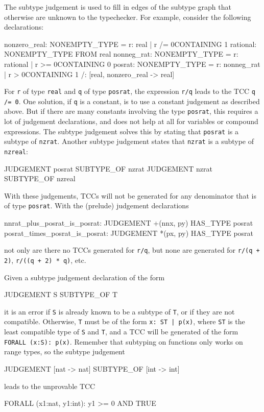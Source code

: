 The subtype judgement is used to fill in edges of the subtype graph that
otherwise are unknown to the typechecker.  For example, consider the
following declarations:
\begin{pvsex}
  nonzero_real: NONEMPTY_TYPE = \setb{}r: real | r /= 0\sete CONTAINING 1
  rational: NONEMPTY_TYPE FROM real
  nonneg_rat: NONEMPTY_TYPE = \setb{}r: rational | r >= 0\sete CONTAINING 0
  posrat: NONEMPTY_TYPE = \setb{}r: nonneg_rat | r > 0\sete  CONTAINING 1
  /: [real, nonzero_real -> real]
\end{pvsex}
For \texttt{r} of type \texttt{real} and \texttt{q} of type
\texttt{posrat}, the expression \texttt{r/q} leads to the TCC \texttt{q
/= 0}.  One solution, if \texttt{q} is a constant, is to use a constant
judgement as described above.  But if there are many constants involving
the type \texttt{posrat}, this requires a lot of judgement declarations,
and does not help at all for variables or compound expressions.  The
subtype judgement solves this by stating that \texttt{posrat} is a subtype
of \texttt{nzrat}.  Another subtype judgement states that \texttt{nzrat}
is a subtype of \texttt{nzreal}:
\begin{pvsex}
  JUDGEMENT posrat SUBTYPE_OF nzrat
  JUDGEMENT nzrat SUBTYPE_OF nzreal
\end{pvsex}
With these judgements, TCCs will not be generated for any denominator that
is of type \texttt{posrat}.  With the (prelude) judgement declarations
\begin{pvsex}
  nnrat_plus_posrat_is_posrat:   JUDGEMENT +(nnx, py) HAS_TYPE posrat
  posrat_times_posrat_is_posrat: JUDGEMENT *(px, py)  HAS_TYPE posrat
\end{pvsex}
not only are there no TCCs generated for \texttt{r/q}, but none are
generated for \texttt{r/(q + 2)}, \texttt{r/((q + 2) * q)}, etc.

Given a subtype judgement declaration of the form
\begin{pvsex}
  JUDGEMENT S SUBTYPE_OF T
\end{pvsex}
it is an error if \texttt{S} is already known to be a subtype of
\texttt{T}, or if they are not compatible.  Otherwise, \texttt{T} must be
of the form \texttt{\setb{}x:\ ST | p(x)\sete}, where \texttt{ST} is the least
compatible type of \texttt{S} and \texttt{T}, and a TCC will be generated
of the form \texttt{FORALL (x:S): p(x)}.  Remember that subtyping on
functions only works on range types, so the subtype judgement
\begin{pvsex}
  JUDGEMENT [nat -> nat] SUBTYPE_OF [int -> int]
\end{pvsex}
leads to the unprovable TCC
\begin{pvsex}
FORALL (x1:nat, y1:int): y1 >= 0 AND TRUE
\end{pvsex}

